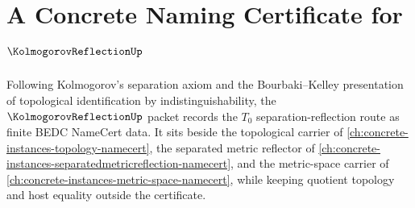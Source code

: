 \chapter{A Concrete Naming Certificate for $\KolmogorovReflectionUp$}
\label{ch:concrete-instances-kolmogorov-reflection-namecert}

Following Kolmogorov's separation axiom and the Bourbaki--Kelley presentation of topological identification by indistinguishability, the $\KolmogorovReflectionUp$ packet records the $T_0$ separation-reflection route as finite BEDC NameCert data. It sits beside the topological carrier of \autoref{ch:concrete-instances-topology-namecert}, the separated metric reflector of \autoref{ch:concrete-instances-separatedmetricreflection-namecert}, and the metric-space carrier of \autoref{ch:concrete-instances-metric-space-namecert}, while keeping quotient topology and host equality outside the certificate.

